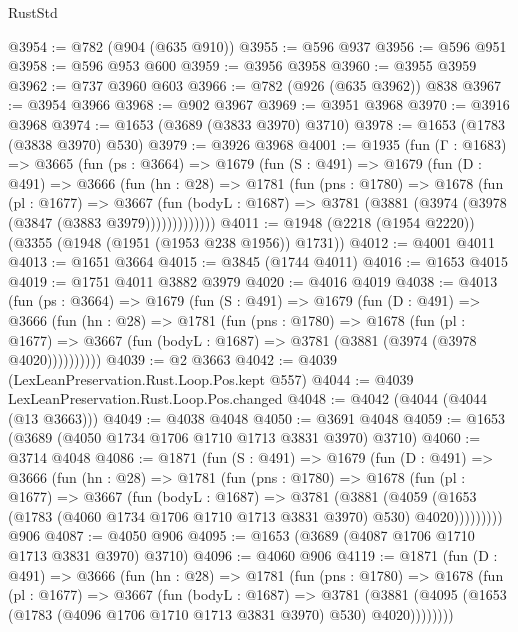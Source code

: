 \begin{lexlean}{RustStd}
\begin{coremodule}
{\begin{coremodule}
{{{{{{{{{{{{{{{{@3954 := @782 (@904 (@635 @910))
@3955 := @596 @937
@3956 := @596 @951
@3958 := @596 @953 @600
@3959 := @3956 @3958
@3960 := @3955 @3959
@3962 := @737 @3960 @603
@3966 := @782 (@926 (@635 @3962)) @838
@3967 := @3954 @3966
@3968 := @902 @3967
@3969 := @3951 @3968
@3970 := @3916 @3968
@3974 := @1653 (@3689 (@3833 @3970) @3710)
@3978 := @1653 (@1783 (@3838 @3970) @530)
@3979 := @3926 @3968
@4001 := @1935
    (fun (Γ : @1683) =>
    @3665
      (fun (ps : @3664) =>
      @1679
        (fun (S : @491) =>
        @1679
          (fun (D : @491) =>
          @3666
            (fun (hn : @28) =>
            @1781
              (fun (pns : @1780) =>
              @1678
                (fun (pl : @1677) =>
                @3667
                  (fun (bodyL : @1687) =>
                  @3781 (@3881 (@3974 (@3978 (@3847 (@3883 @3979)))))))))))))
@4011 := @1948 (@2218 (@1954 @2220)) (@3355 (@1948 (@1951 (@1953 @238 @1956)) @1731))
@4012 := @4001 @4011
@4013 := @1651 @3664
@4015 := @3845 (@1744 @4011)
@4016 := @1653 @4015
@4019 := @1751 @4011 @3882 @3979
@4020 := @4016 @4019
@4038 := @4013
    (fun (ps : @3664) =>
    @1679
      (fun (S : @491) =>
      @1679
        (fun (D : @491) =>
        @3666
          (fun (hn : @28) =>
          @1781
            (fun (pns : @1780) =>
            @1678
              (fun (pl : @1677) =>
              @3667 (fun (bodyL : @1687) => @3781 (@3881 (@3974 (@3978 @4020))))))))))
@4039 := @2 @3663
@4042 := @4039 (LexLeanPreservation.Rust.Loop.Pos.kept @557)
@4044 := @4039 LexLeanPreservation.Rust.Loop.Pos.changed
@4048 := @4042 (@4044 (@4044 (@13 @3663)))
@4049 := @4038 @4048
@4050 := @3691 @4048
@4059 := @1653 (@3689 (@4050 @1734 @1706 @1710 @1713 @3831 @3970) @3710)
@4060 := @3714 @4048
@4086 := @1871
    (fun (S : @491) =>
    @1679
      (fun (D : @491) =>
      @3666
        (fun (hn : @28) =>
        @1781
          (fun (pns : @1780) =>
          @1678
            (fun (pl : @1677) =>
            @3667
              (fun (bodyL : @1687) =>
              @3781
                (@3881
                  (@4059
                    (@1653 (@1783 (@4060 @1734 @1706 @1710 @1713 @3831 @3970) @530) @4020)))))))))
    @906
@4087 := @4050 @906
@4095 := @1653 (@3689 (@4087 @1706 @1710 @1713 @3831 @3970) @3710)
@4096 := @4060 @906
@4119 := @1871
    (fun (D : @491) =>
    @3666
      (fun (hn : @28) =>
      @1781
        (fun (pns : @1780) =>
        @1678
          (fun (pl : @1677) =>
          @3667
            (fun (bodyL : @1687) =>
            @3781
              (@3881 (@4095 (@1653 (@1783 (@4096 @1706 @1710 @1713 @3831 @3970) @530) @4020))))))))
}}}}}}}}}}}}}}}}
\end{coremodule}}
\end{coremodule}
\end{lexlean}
